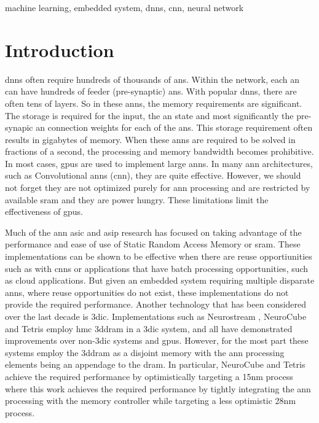 \documentclass[journal]{IEEEtran}
\begin{document}
\begin{IEEEkeywords}
machine learning, embedded system, \acp{dnn}, \ac{cnn}, neural network
\end{IEEEkeywords}

\IEEEpeerreviewmaketitle


\section{Introduction}
 \acp{dnn} often require hundreds of thousands of \acp{an}.
Within the network, each \ac{an} can have hundreds of feeder (pre-synaptic) \acp{an}.
With popular \acp{dnn}, there are often tens of layers. 
So in these \acp{ann}, the memory requirements are significant. The storage is required for the input, the \ac{an} state and most significantly the pre-synapic \ac{an} connection weights for each of the \acp{an}. 
This storage requirement often results in gigabytes of memory.
When these \acp{ann} are required to be solved in fractions of a second, the processing and memory bandwidth becomes prohibitive.
In most cases, \acp{gpu} are used to implement large \acp{ann}. In many \ac{ann} architectures, such as Convolutional \acp{ann} (\ac{cnn}), they are quite effective. 
However, we should not forget they are not optimized purely for \ac{ann} processing and are restricted by available \ac{sram} and they are power hungry. These limitations limit the effectiveness of \acp{gpu}.

Much of the \ac{ann} \ac{asic} and \ac{asip} research has focused on taking advantage of the performance and ease of use of Static Random Access Memory or \ac{sram}. 
These implementations can be shown to be effective when there are reuse opportiunities such as with \acp{cnn} or applications that have batch processing opportunities, such as cloud applications.
But given an embedded system requiring multiple disparate \acp{ann}, where reuse opportunities do not exist, these implementations do not provide the required performance.
Another technology that has been considered over the last decade is \ac{3dic}.
Implementations such as Neurostream \cite{azarkhish2017neurostream}, NeuroCube\cite{kim2016neurocube} and Tetris \cite{gao2017tetris} employ \ac{hmc} \ac{3ddram} in a \ac{3dic} system, 
and all have demonstrated improvements over non-\ac{3dic} systems and \acp{gpu}.
However, for the most part these systems employ the \ac{3ddram} as a disjoint memory with the \ac{ann} processing elements being an appendage to the \ac{dram}.
In particular, NeuroCube\cite{kim2016neurocube} and Tetris \cite{gao2017tetris} achieve the required performance by optimistically targeting a 15nm process where this work achieves the required performance by tightly integrating
the \ac{ann} processing with the memory controller while targeting a less optimistic 28nm process.
\end{document}
